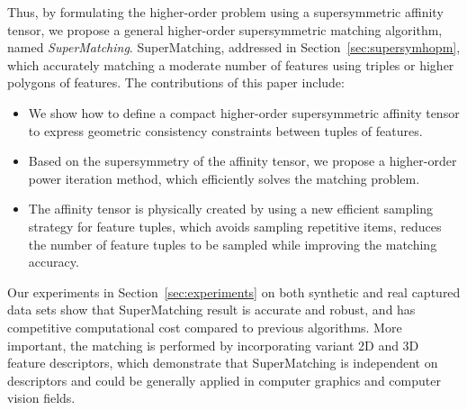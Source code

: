 Thus, by formulating the higher-order problem using a supersymmetric affinity tensor,
we propose a general higher-order supersymmetric matching algorithm, named \emph{SuperMatching}.
SuperMatching, addressed in Section~\ref{sec:supersymhopm}, which accurately matching a moderate number of features using triples or higher polygons of features.
The contributions of this paper include:
\begin{itemize}
\item We show how to define a compact higher-order supersymmetric affinity tensor to express geometric consistency constraints between tuples of features.

\item Based on the supersymmetry of the affinity tensor, we propose a higher-order power iteration method, which efficiently solves the matching problem.

\item The affinity tensor is physically created by using a new efficient sampling strategy for feature tuples,
which avoids sampling repetitive items, reduces the number of feature tuples to be sampled while improving the matching accuracy.

\end{itemize}

Our experiments in Section~\ref{sec:experiments} on both synthetic and real captured data sets show that SuperMatching result is accurate and robust,
and has competitive computational cost compared to previous algorithms.
More important, the matching is performed by incorporating variant 2D and 3D feature descriptors,
which demonstrate that SuperMatching is independent on descriptors and could be generally applied in computer graphics and computer vision fields.

